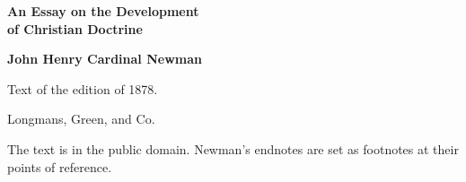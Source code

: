 \documentclass[11pt,letterpaper]{article}
\begin{document}
\color{ink}

\begin{titlepage}
\centering
\vspace*{4em}
{\LARGE\bfseries\color{heading} An Essay on the Development\\[0.3em]
of Christian Doctrine\par}
\vspace{2em}
{\LARGE\bfseries\color{heading} John Henry Cardinal Newman\par}
\vspace{3em}
{Text of the edition of 1878.\par}
\vspace{1em}
{Longmans, Green, and Co.\par}
\vfill
{\small The text is in the public domain. Newman's endnotes are set as
footnotes at their points of reference.\par}
\vspace{2em}
\end{titlepage}

\tableofcontents


\end{document}
